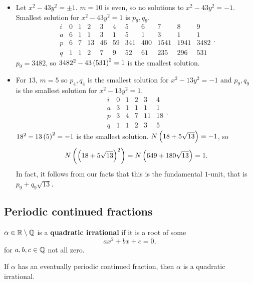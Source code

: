 \begin{example*}
\hfill
\begin{itemize}
\item Let $ x^2 - 43y^2 = \pm 1 $. $ m = 10 $ is even, so no solutions to $ x^2 - 43y^2 = -1 $. Smallest solution for $ x^2 - 43y^2 = 1 $ is $ p_9, q_9 $.
$$
\begin{array}{c|cccccccccc}
i & 0 & 1 & 2 & 3 & 4 & 5 & 6 & 7 & 8 & 9 \\
\hline
a & 6 & 1 & 1 & 3 & 1 & 5 & 1 & 3 & 1 & 1 \\
p & 6 & 7 & 13 & 46 & 59 & 341 & 400 & 1541 & 1941 & 3482 \\
q & 1 & 1 & 2 & 7 & 9 & 52 & 61 & 235 & 296 & 531
\end{array}.
$$
$ p_9 = 3482 $, so $ 3482^2 - 43\br{531}^2 = 1 $ is the smallest solution.
\item For $ 13 $, $ m = 5 $ so $ p_4, q_4 $ is the smallest solution for $ x^2 - 13y^2 = -1 $ and $ p_9, q_9 $ is the smallest solution for $ x^2 - 13y^2 = 1 $.
$$
\begin{array}{c|ccccc}
i & 0 & 1 & 2 & 3 & 4 \\
\hline
a & 3 & 1 & 1 & 1 & 1 \\
p & 3 & 4 & 7 & 11 & 18 \\
q & 1 & 1 & 2 & 3 & 5
\end{array}.
$$
$ 18^2 - 13\br{5}^2 = -1 $ is the smallest solution. $ N\br{18 + 5\sqrt{13}} = -1 $, so
$$ N\br{\br{18 + 5\sqrt{13}}^2} = N\br{649 + 180\sqrt{13}} = 1. $$
In fact, it follows from our facts that this is the fundamental $ 1 $-unit, that is $ p_9 + q_9\sqrt{13} $.
\end{itemize}
\end{example*}

\pagebreak

\subsection{Periodic continued fractions}


\begin{definition}
$ \alpha \in \mathbb{R} \setminus \mathbb{Q} $ is a \textbf{quadratic irrational} if it is a root of some
$$ ax^2 + bx + c = 0, $$
for $ a, b, c \in \mathbb{Q} $ not all zero.
\end{definition}

\begin{proposition}
If $ \alpha $ has an eventually periodic continued fraction, then $ \alpha $ is a quadratic irrational.
\end{proposition}

